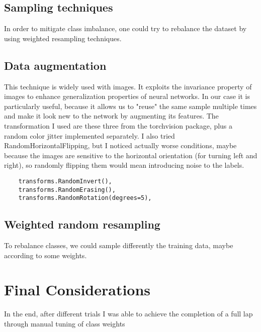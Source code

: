 \documentclass[12pt,a4paper,oneside]{article}
\begin{document}
\subsection{Sampling techniques}

In order to mitigate class imbalance, one could try to rebalance the dataset by
using weighted resampling techniques.

\subsection{Data augmentation}

This technique is widely used with images. It exploits the invariance property
of images to enhance generalization properties of neural networks. In our case
it is particularly useful, because it allows us to "reuse" the same sample
multiple times and make it look new to the network by augmenting its features.
The transformation I used are these three from the torchvision package, plus a
random color jitter implemented separately. I also tried
RandomHorizontalFlipping, but I noticed actually worse conditions, maybe because
the images are sensitive to the horizontal orientation (for turning left and
right), so randomly flipping them would mean introducing noise to the labels.

\begin{verbatim}
    transforms.RandomInvert(),
    transforms.RandomErasing(),
    transforms.RandomRotation(degrees=5),
\end{verbatim}

\subsection{Weighted random resampling}

To rebalance classes, we could sample differently the training data, maybe
according to some weights. 

\section{Final Considerations}

In the end, after different trials I was able to achieve the completion of a
full lap through manual tuning of class weights 



\nocite{*}  %
\end{document}
